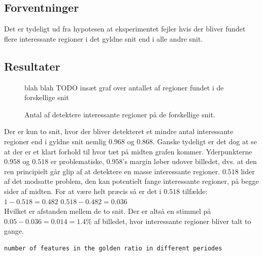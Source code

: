 {\subsection{Forventninger}
Det er tydeligt ud fra hypotesen at eksperimentet fejler hvis der bliver
fundet flere interessante regioner i det gyldne snit end i alle andre
snit.

\subsection{Resultater}
\begin{figure}
	\begin{center}
		blah blah TODO insæt graf over antallet af regioner fundet i de
		forskellige snit
	\end{center}
	\caption{Antal af detektere interessante regioner på de forskellige snit.}
	\label{diffratios}
\end{figure}
Der er kun to snit, hvor der bliver detekteret et mindre antal
interessante regioner end i gyldne snit nemlig $0.968$ og
$0.868$. Ganske tydeligt er det dog at se at der er et klart forhold til
hvor tæt på midten grafen kommer.
Yderpunkterne $0.958$ og $0.518$ er problematiske, $0.958$'s margin
løber udover billedet, dvs. at den ren principielt går glip af at
detektere en masse interessante regioner.
$0.518$ lider af det modsatte problem, den kan potentielt fange
interessante regioner, på begge sider af midten.
For at være helt præcis så er det i $0.518$ tilfælde:\\
$1-0.518 = 0.482$
$0.518-0.482=0.036$\\
Hvilket er afstanden mellem de to snit.
Der er altså en stimmel på $0.05-0.036 = 0.014 = 1.4\%$ af billedet,
hvor interessante regioner bliver talt to gange.


\begin{verbatim}
number of features in the golden ratio in different periodes


\end{verbatim}}
